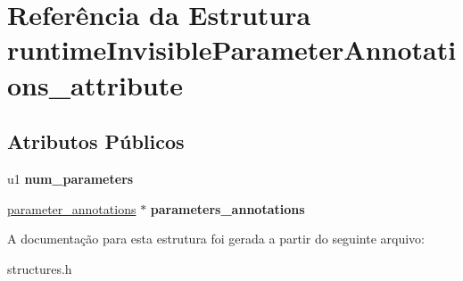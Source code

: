 \hypertarget{structruntimeInvisibleParameterAnnotations__attribute}{}\section{Referência da Estrutura runtime\+Invisible\+Parameter\+Annotations\+\_\+attribute}
\label{structruntimeInvisibleParameterAnnotations__attribute}
\subsection*{Atributos Públicos}
\begin{DoxyCompactItemize}
\item 
\mbox{\label{structruntimeInvisibleParameterAnnotations__attribute_a9cd7cc3ab3d3b8992aacd54480384375}} 
u1 {\bfseries num\+\_\+parameters}
\item 
\mbox{\label{structruntimeInvisibleParameterAnnotations__attribute_a5e720df1952e818a4b5973aec115eade}} 
\hyperlink{structparameter__annotations}{parameter\+\_\+annotations} $\ast$ {\bfseries parameters\+\_\+annotations}
\end{DoxyCompactItemize}


A documentação para esta estrutura foi gerada a partir do seguinte arquivo\+:\begin{DoxyCompactItemize}
\item 
structures.\+h\end{DoxyCompactItemize}

